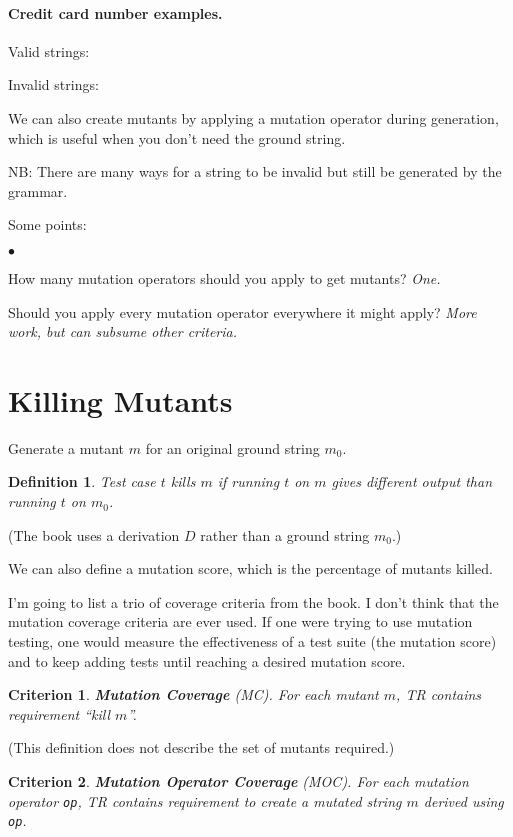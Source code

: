 \documentclass[11pt]{article}
\newtheorem{defn}{Definition}
\newtheorem{crit}{Criterion}
\newcommand{\squishlist}{
 \begin{list}{$\bullet$}
  { \setlength{\itemsep}{0pt}
     \setlength{\parsep}{3pt}
     \setlength{\topsep}{3pt}
     \setlength{\partopsep}{0pt}
     \setlength{\leftmargin}{1.5em}
     \setlength{\labelwidth}{1em}
     \setlength{\labelsep}{0.5em} } }
\newcommand{\squishend}{
  \end{list}  }
\begin{document}
\paragraph{Credit card number examples.}
{\sf Valid strings:} %

\noindent
{\sf Invalid strings:} %

We can also create mutants by applying a mutation operator during generation,
which is useful when you don't need the ground string.

NB: There are many ways for a string to be invalid but still be generated
by the grammar.

\newpage
Some points:
\squishlist
\item How many mutation operators should you apply to get mutants? \emph{One.}
\item Should you apply every mutation operator everywhere it might apply? \emph{More work, but can subsume other criteria.}
\squishend

\section*{Killing Mutants} 
Generate a mutant $m$ for an original ground string $m_0$.
\begin{defn}
Test case $t$ \emph{kills} $m$ if running $t$ on $m$ gives different 
output than running $t$ on $m_0$.
\end{defn}
(The book uses a derivation $D$ rather than a ground string $m_0$.)

We can also define a mutation score, which is the percentage of mutants killed.

I'm going to list a trio of coverage criteria from the book. I don't
think that the mutation coverage criteria are ever used. If one were trying to use
mutation testing, one would measure the effectiveness of a test
suite (the mutation score) and to keep adding tests until reaching a desired
mutation score.

\begin{crit}
{\bf Mutation Coverage} (MC). For each mutant $m$, TR contains
requirement ``kill $m$''.
\end{crit}
(This definition does not describe the set of mutants required.)

\begin{crit} 
{\bf Mutation Operator Coverage} (MOC). For each mutation operator {\tt op}, 
TR contains requirement to create a mutated string $m$ 
derived using {\tt op}.
\end{crit}
\end{document}
